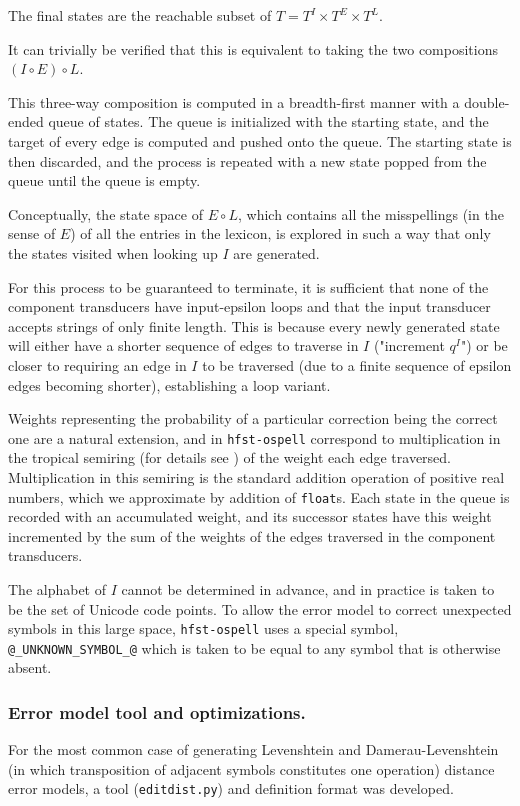 \documentclass{llncs}
\begin{document}
The final states are the reachable subset of $T = T^I \times T^E \times T^L$.

It can trivially be verified that this is equivalent to taking the two
compositions $(I \circ E) \circ L$.

This three-way composition is computed in a breadth-first manner with a
double-ended queue of states. The queue is initialized with the starting state,
and the target of every edge is computed and pushed onto the
queue. The starting state is then discarded, and the process is repeated
with a new state popped from the queue until the queue is empty.

Conceptually, the state space of $E \circ L$, which contains all the
misspellings (in the sense of $E$) of all the entries in the lexicon, is
explored in such a way that only the states visited when looking up $I$ are
generated.

For this process to be guaranteed to terminate, it is sufficient that none of
the component transducers have input-epsilon loops and that the input
transducer accepts strings of only finite length. This is because every newly
generated state will either have a shorter sequence of edges to traverse in
$I$ ("increment $q^I$") or be closer to requiring an edge in $I$ to be traversed
(due to a finite sequence of epsilon edges becoming shorter), establishing a
loop variant.

Weights representing the probability of a particular correction being the
correct one are a natural extension, and in \verb!hfst-ospell! correspond to
multiplication in the tropical semiring (for details see \cite{openfst/2007})
of the weight each edge
traversed. Multiplication in this semiring is the standard addition operation
of positive real numbers, which we approximate by addition of \verb!float!s.
Each state in the queue is recorded with an accumulated weight, and its
successor states have this weight incremented by the sum of the weights of
the edges traversed in the component transducers.

The alphabet of $I$ cannot be determined in advance, and in practice is taken
to be the set of Unicode code points. To allow the error model to correct
unexpected symbols in this large space, \verb!hfst-ospell! uses a special
symbol, \verb!@_UNKNOWN_SYMBOL_@! which is taken to be equal to any symbol
that is otherwise absent.

\subsubsection{Error model tool and optimizations.}
For the most common case of generating Levenshtein and
Damerau-Levenshtein (in which transposition of adjacent symbols constitutes
one operation) distance error models, a tool (\verb!editdist.py!) and
definition format was developed.
\end{document}
